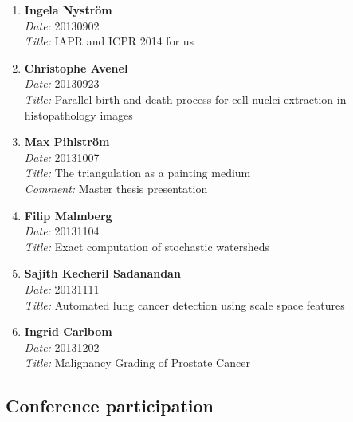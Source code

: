 \begin{enumerate}
\item
{\bf Ingela Nystr\"{o}m}~\\
{\em Date:} 20130902 ~\\
{\em Title:} IAPR and ICPR 2014 for us

\item
{\bf Christophe Avenel}~\\
{\em Date:} 20130923 ~\\
{\em Title:} Parallel birth and death process for cell nuclei extraction in histopathology images

\item
{\bf Max Pihlstr\"{o}m}~\\
{\em Date:} 20131007 ~\\
{\em Title:} The triangulation as a painting medium~\\
{\em Comment:} Master thesis presentation

\item
{\bf Filip Malmberg}~\\
{\em Date:} 20131104 ~\\
{\em Title:} Exact computation of stochastic watersheds

\item
{\bf Sajith Kecheril Sadanandan}~\\
{\em Date:} 20131111 ~\\
{\em Title:} Automated lung cancer detection using scale space features

\item
{\bf Ingrid Carlbom}~\\
{\em Date:} 20131202 ~\\
{\em Title:} Malignancy Grading of Prostate Cancer



\end{enumerate}

\subsection{Conference participation}


